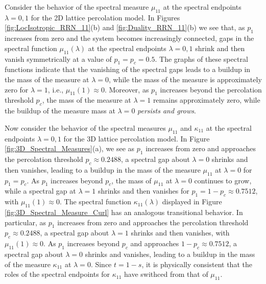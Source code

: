 \documentclass{cmslatex}
\begin{document}
Consider the behavior of the spectral measure $\mu_{11}$ at the spectral
endpoints $\lambda=0,1$ for the 2D lattice percolation model. In Figures
\ref{fig:LocIsotropic_RRN_11}(b) and \ref{fig:Duality_RRN_11}(b) we
see that, as $p_1$ increases from zero  
and the system becomes increasingly connected, gaps in the spectral
function $\mu_{11}(\lambda)$ at the spectral endpoints $\lambda=0,1$ shrink and then
vanish  symmetrically at a value of $p_1=p_c=0.5$. The graphs of 
these spectral functions indicate that the vanishing of the spectral
gaps leads to a buildup in the mass of the measure at $\lambda=0$, while the
mass of the measure is approximately zero for $\lambda=1$, i.e.,
$\mu_{11}(1)\approx0$. Moreover, as $p_1$ increases beyond the percolation
threshold $p_c$, the mass of the measure at $\lambda=1$ remains
approximately zero, while the buildup of the measure mass at
$\lambda=0$ \emph{persists and grows}. 



Now consider the behavior of the spectral measures $\mu_{11}$ and
$\kappa_{11}$ at the spectral
endpoints $\lambda=0,1$ for the 3D lattice percolation model. In Figure
\ref{fig:3D_Spectral_Measures}(a), we see as $p_1$ increases from
zero and approaches the percolation threshold $p_c\approx0.2488$, a spectral
gap about $\lambda=0$ shrinks and then vanishes, leading to a
buildup in the mass of the measure $\mu_{11}$ at $\lambda=0$ for $p_1=p_c$. As
$p_1$ increases beyond $p_c$, the mass of $\mu_{11}$ at $\lambda=0$ continues
to grow, while a spectral gap at $\lambda=1$ shrinks and
then vanishes for $p_1=1-p_c\approx0.7512$, with $\mu_{11}(1)\approx0$. The
spectral function $\kappa_{11}(\lambda)$ displayed in Figure
\ref{fig:3D_Spectral_Measure_Curl} has an analogous transitional
behavior. In particular, as $p_1$ increases from zero and approaches
the percolation threshold $p_c\approx0.2488$, a spectral gap about $\lambda=1$
shrinks and then vanishes, with $\mu_{11}(1)\approx0$. As $p_1$ increases
beyond $p_c$ and approaches $1-p_c\approx0.7512$, a spectral gap about $\lambda=0$
shrinks and vanishes, leading to a buildup in the mass of the measure
$\kappa_{11}$ at $\lambda=0$. Since $t=1-s$, it is physically consistent that the
roles of the spectral endpoints for $\kappa_{11}$ have swithced from that
of $\mu_{11}$.     
\end{document}

